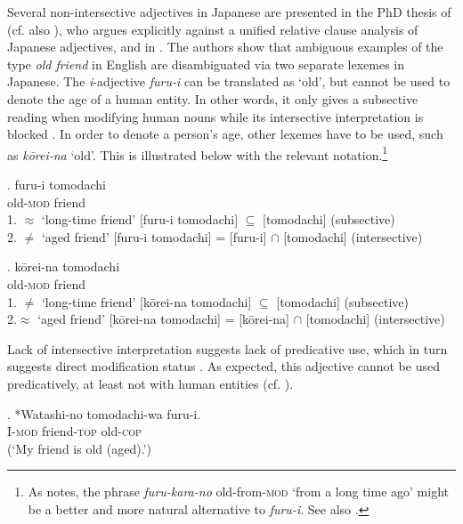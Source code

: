 \documentclass [output=book,colorlinks,citecolor=brown]{langscibook}
\begin{document}
Several non-intersective adjectives in Japanese are presented in the PhD thesis of \citet{yamakido:2005:nature} (cf. also \citealt{yamakido:2000:japanese, yamakido:2007:nature}), who argues explicitly against a unified relative clause analysis of Japanese adjectives, and in \citet{ayano:2010:revisiting}. The authors show that ambiguous examples of the type \textit{old friend} in English are disambiguated via two separate lexemes in Japanese. The \textit{i}-adjective \textit{furu-i} can be translated as `old’, but cannot be used to denote the age of a human entity. In other words, it only gives a subsective reading when modifying human nouns while its intersective interpretation is blocked \citep[66–67]{yamakido:2005:nature}. In order to denote a person's age, other lexemes have to be used, such as \textit{kōrei-na} `old’. This is illustrated below with the relevant notation.\footnote{As \citet[511, Fn. 7]{watanabe:2012:direct} notes, the phrase \textit{furu-kara-no} old-from-\textsc{mod} `from a long time ago' might be a better and more natural alternative to \textit{furu-i}. See also \citet[155–156]{tatsuki:2009:nihongo}.} %

\exg. furu-i tomodachi\\
old-\textsc{mod} friend \null \hfill \citep[81]{yamakido:2005:nature}\\
1. $\approx$ `long-time friend’ [furu-i tomodachi] $\subseteq$ [tomodachi] (subsective)\\
2. $\neq$ `aged friend’ [furu-i tomodachi] = [furu-i] $\cap$ [tomodachi] (intersective)

\exg. kōrei-na tomodachi\\
old-\textsc{mod} friend \null \hfill \citep[67]{yamakido:2005:nature}\\
1. $\neq$ `long-time friend’ [kōrei-na tomodachi] $\subseteq$ [tomodachi] (subsective)\\
2.$\approx$ `aged friend’ [kōrei-na tomodachi] = [kōrei-na] $\cap$ [tomodachi] (intersective)

Lack of intersective interpretation suggests lack of predicative use, which in turn suggests direct modification status \citep{larson:1998:events, cinque:2010:adj}. As expected, this adjective cannot be used predicatively, at least not with human entities (cf. \citealt[67]{yamakido:2005:nature}). %

\exg. *Watashi-no tomodachi-wa furu-i.\\
I-\textsc{mod} friend-\textsc{top} old-\textsc{cop}\\
(`My friend is old (aged).’)
\end{document}

